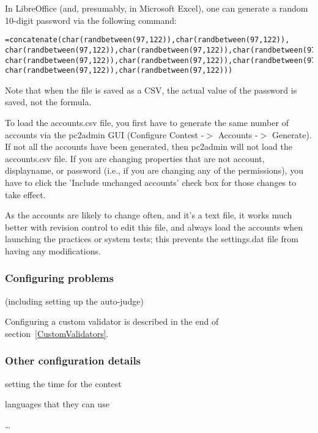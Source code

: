In LibreOffice (and, presumably, in Microsoft Excel), one can generate
a random 10-digit password via the following command: 

\begin{verbatim}
=concatenate(char(randbetween(97,122)),char(randbetween(97,122)),
char(randbetween(97,122)),char(randbetween(97,122)),char(randbetween(97,122)),
char(randbetween(97,122)),char(randbetween(97,122)),char(randbetween(97,122)),
char(randbetween(97,122)),char(randbetween(97,122)))
\end{verbatim}

Note that when the file is saved as a CSV, the actual value of the
password is saved, not the formula.

To load the accounts.csv file, you first have to generate the same
number of accounts via the pc2admin GUI (Configure Contest -$>$
Accounts -$>$ Generate).  If not all the accounts have been generated,
then pc2admin will not load the accounts.csv file.  If you are
changing properties that are not account, displayname, or password
(i.e., if you are changing any of the permissions), you have to click
the 'Include unchanged accounts' check box for those changes to take
effect.

As the accounts are likely to change often, and it's a text file, it
works much better with revision control to edit this file, and always
load the accounts when launching the practices or system tests; this
prevents the settings.dat file from having any modifications.

\subsubsection{Configuring problems}

(including setting up the auto-judge)

Configuring a custom validator is described in the end of
section~\ref{CustomValidators}.

\subsubsection{Other configuration details}

\begin{itemlist}
\item setting the time for the contest
\item languages that they can use
\item \ldots
\end{itemlist}


